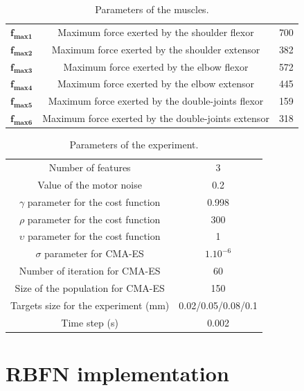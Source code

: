 \documentclass[pdftex,a4paper,11pt]{report}
\begin{document}
\begin{table}[hbt]
\caption{Parameters of the muscles.}
\begin{center}
\begin{tabular}{|c|c|c|}
\hline  
$\textbf{f}_{\textbf{max1}}$ & Maximum force exerted by the shoulder flexor & 700\\
$\textbf{f}_{\textbf{max2}}$ & Maximum force exerted by the shoulder extensor & 382\\
$\textbf{f}_{\textbf{max3}}$ & Maximum force exerted by the elbow flexor & 572\\
$\textbf{f}_{\textbf{max4}}$ & Maximum force exerted by the elbow extensor & 445\\
$\textbf{f}_{\textbf{max5}}$ & Maximum force exerted by the double-joints flexor & 159\\
$\textbf{f}_{\textbf{max6}}$ & Maximum force exerted by the double-joints extensor & 318\\
\hline
\end{tabular}
\end{center}
\label{MuscleParamTable}
\end{table}

\begin{table}[hbt]
\caption{Parameters of the experiment.}
\begin{center}
\begin{tabular}{|c|c|}
\hline  
Number of features & 3\\
Value of the motor noise & 0.2\\
$\gamma$ parameter for the cost function & 0.998\\
$\rho$ parameter for the cost function & 300\\
$\upsilon$ parameter for the cost function & 1\\
$\sigma$ parameter for CMA-ES & $1.10^{-6}$\\
Number of iteration for CMA-ES & 60 \\
Size of the population for CMA-ES & 150 \\
Targets size for the experiment (mm) & 0.02/0.05/0.08/0.1 \\
Time step (s) & 0.002 \\
\hline
\end{tabular}
\end{center}
\label{ExperimentParam}
\end{table}

\pagebreak

\section{RBFN implementation}
\label{sec_rbfnCode}




\end{document}
